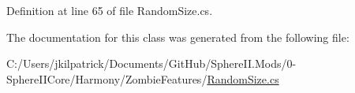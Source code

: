 Definition at line 65 of file Random\+Size.\+cs.



The documentation for this class was generated from the following file\+:\begin{DoxyCompactItemize}
\item 
C\+:/\+Users/jkilpatrick/\+Documents/\+Git\+Hub/\+Sphere\+I\+I.\+Mods/0-\/\+Sphere\+I\+I\+Core/\+Harmony/\+Zombie\+Features/\mbox{\hyperlink{_random_size_8cs}{Random\+Size.\+cs}}\end{DoxyCompactItemize}
